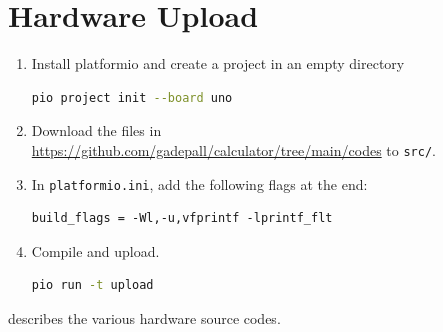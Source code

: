 \documentclass[conference]{IEEEtran}
\begin{document}
\section{Hardware Upload}
\label{app:hardware}
\begin{enumerate}
  \item Install platformio and create a project in an empty directory
    \begin{lstlisting}[language=bash]
pio project init --board uno\end{lstlisting}
\item Download the files in \url{https://github.com/gadepall/calculator/tree/main/codes} to \verb|src/|.
\item In \verb|platformio.ini|, add the following flags at the end:
  \begin{lstlisting}
build_flags = -Wl,-u,vfprintf -lprintf_flt\end{lstlisting}
  \item Compile and upload.
    \begin{lstlisting}[language=bash]
pio run -t upload\end{lstlisting}
\end{enumerate}
describes the various hardware source codes.

\end{document}

